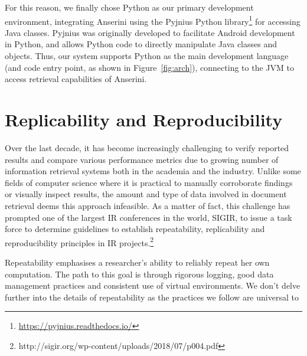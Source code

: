 For this reason, we finally chose Python as our primary development environment, integrating Anserini using the Pyjnius Python library\footnote{\url{https://pyjnius.readthedocs.io/}} for accessing Java classes.
Pyjnius was originally developed to facilitate Android development in Python, and allows Python code to directly manipulate Java classes and objects.
Thus, our system supports Python as the main development language (and code entry point, as shown in Figure~\ref{fig:arch}), connecting to the JVM to access retrieval capabilities of Anserini.

\section{Replicability and Reproducibility}

Over the last decade, it has become increasingly challenging to verify reported results and compare various performance metrics due to growing number of information retrieval systems both in the academia and the industry.
Unlike some fields of computer science where it is practical to manually corroborate findings or visually inspect results, the amount and type of data involved in document retrieval deems this approach infeasible.
As a matter of fact, this challenge has prompted one of the largest IR conferences in the world, SIGIR, to issue a task force to determine guidelines to establish repeatability, replicability and reproducibility principles in IR projects.\footnote{http://sigir.org/wp-content/uploads/2018/07/p004.pdf}

Repeatability emphasises a researcher's ability to reliably repeat her own computation.
The path to this goal is through rigorous logging, good data management practices and consistent use of virtual environments.
We don't delve further into the details of repeatability as the practices we follow are universal to 

